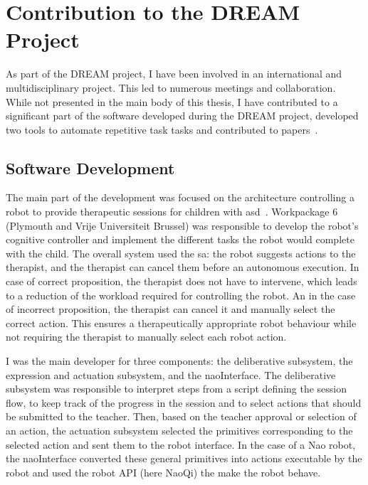 \cleartooddpage
\chapter{Contribution to the DREAM Project} \label{app:dream}
\glsresetall

As part of the DREAM project, I have been involved in an international and multidisciplinary project. This led to numerous meetings and collaboration. While not presented in the main body of this thesis, I have contributed to a significant part of the software developed during the DREAM project, developed two tools to automate repetitive task tasks and contributed to papers~\citep{esteban2017build,cao2018personalized}.

\section{Software Development}

The main part of the development was focused on the architecture controlling a robot to provide therapeutic sessions for children with \gls{asd}~\citep{esteban2017build}. Workpackage 6 (Plymouth and Vrije Universiteit Brussel) was responsible to develop the robot's cognitive controller and implement the different tasks the robot would complete with the child. The overall system used the \gls{sa}: the robot suggests actions to the therapist, and the therapist can cancel them before an autonomous execution. In case of correct proposition, the therapist does not have to intervene, which leads to a reduction of the workload required for controlling the robot. An in the case of incorrect proposition, the therapist can cancel it and manually select the correct action. This ensures a therapeutically appropriate robot behaviour while not requiring the therapist to manually select each robot action. 

I was the main developer for three components: the deliberative subsystem, the expression and actuation subsystem, and the naoInterface. The deliberative subsystem was responsible to interpret steps from a script defining the session flow, to keep track of the progress in the session and to select actions that should be submitted to the teacher. Then, based on the teacher approval or selection of an action, the actuation subsystem selected the primitives corresponding to the selected  action and sent them to the robot interface. In the case of a Nao robot, the naoInterface converted these general primitives into actions executable by the robot and used the robot API (here NaoQi) the make the robot behave. 

